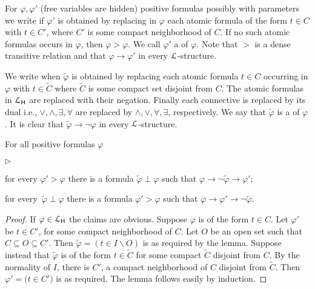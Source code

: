 \documentclass[10pt,oneside]{amsproc}
\newcommand{\mylabel}[1]{{#1}\hfill}
\renewenvironment{itemize}
  {\begin{list}{$\triangleright$}{%
  \setlength{\parskip}{0mm}
  \setlength{\topsep}{.4\baselineskip}
  \setlength{\rightmargin}{0mm}
  \setlength{\listparindent}{0mm}
  \setlength{\itemindent}{0mm}
  \setlength{\labelwidth}{3ex}
  \setlength{\itemsep}{.2\baselineskip}
  \setlength{\parsep}{.2\baselineskip}
  \setlength{\partopsep}{0mm}
  \setlength{\labelsep}{1ex}
  \setlength{\leftmargin}{\labelwidth+\labelsep}
  \let\makelabel\mylabel}}{%
\end{list}}
\renewcommand*{\emph}[1]{%
   \smash{\tikz[baseline]\node[rectangle, fill=teal!25, rounded corners, inner xsep=0.5ex, inner ysep=0.2ex, anchor=base, minimum height = 2.7ex]{\strut #1};}}
\begin{document}
For $\varphi,\varphi'$ (free variables are hidden) positive formulas possibly with parameters we write \emph{$\varphi'>\varphi$\/} if $\varphi'$ is obtained by replacing in $\varphi$ each atomic formula of the form $t\in C$ with $t\in C'$, where $C'$ is some compact neighborhood of $C$.
If no such atomic formulas occurs in $\varphi$, then $\varphi>\varphi$.
We call $\varphi'$ a \emph{weakening\/} of $\varphi$.
Note that $>$ is a dense transitive relation and that  $\varphi\to\varphi'$ in every ${\EuScript L}$-structure.

We write \emph{$\tilde{\varphi}\perp\varphi$\/} when $\tilde{\varphi}$ is obtained by replacing each atomic formula $t\in C$ occurring in $\varphi$ with $t\in\tilde{C}$ where $\tilde{C}$ is some compact set disjoint from $C$.
The atomic formulas in ${\EuScript L}_{\sf H}$ are replaced with their negation.
Finally each connective is replaced by its dual i.e., $\vee, \wedge, \exists,\forall$ are replaced by $\wedge,\vee,\forall,\exists$, respectively.
We say that  $\tilde{\varphi}$ is a \emph{strong negation} of $\varphi$.
It is clear that $\tilde{\varphi}\rightarrow\neg\varphi$ in every ${\EuScript L}$-structure.

\begin{lemma}\label{lem_interpolation}
  For all positive formulas $\varphi$
  \begin{itemize}
    \item[1.]for every $\varphi'>\varphi$ there is a formula $\tilde{\varphi}\perp\varphi$ such that $\varphi\rightarrow\neg \tilde{\varphi}\rightarrow\varphi'$;
    \item[2.] for every\, $\tilde{\varphi}\perp\varphi$ there is a formula $\varphi'>\varphi$ such that  $\varphi\rightarrow\varphi'\rightarrow\neg \tilde{\varphi}$.
  \end{itemize}
\end{lemma}

\begin{proof}
  If $\varphi\in {\EuScript L}_{\sf H}$ the claims are obvious.
  Suppose $\varphi$ is of the form $t\in C$.
  Let $\varphi'$ be $t\in C'$, for some compact neighborhood of $C$.
  Let $O$ be an open set such that $C\subseteq O\subseteq C'$.
  Then $\tilde{\varphi}=(t\in I\smallsetminus O)$ is as required by the lemma.
  Suppose instead that $\tilde{\varphi}$ is of the form $t\in\tilde{C}$ for some compact $\tilde{C}$ disjoint from $C$.
  By the normality of $I$, there is  $C'$, a compact neighborhood of $C$ disjoint from $\tilde{C}$.
  Then  $\varphi'=\big(t\in C'\big)$ is as required.
  The lemma follows easily by induction.
\end{proof}
\end{document}
